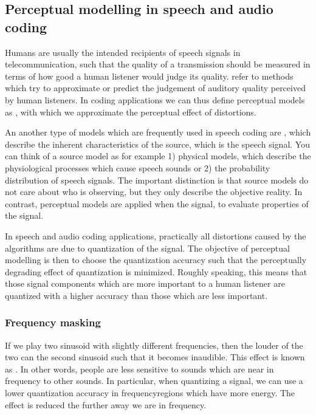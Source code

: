 \documentclass[letterpaper,10pt,english]{jupyterBook}
\begin{document}
\subsection{Perceptual modelling in speech and audio coding}
\label{\detokenize{Transmission/Perceptual_modelling_in_speech_and_audio_coding:perceptual-modelling-in-speech-and-audio-coding}}\label{\detokenize{Transmission/Perceptual_modelling_in_speech_and_audio_coding::doc}}
\sphinxAtStartPar
Humans are usually the intended recipients of speech signals in
telecommunication, such that the quality of a transmission should be
measured in terms of how good a human listener would judge its quality.
 refer to methods which try to approximate or predict
the judgement of auditory quality perceived by human listeners. In
coding applications we can thus define perceptual models as , with which we approximate the perceptual effect of distortions.

\sphinxAtStartPar
An another type of models which are frequently used in speech coding are
, which describe the inherent characteristics of the
source, which is the speech signal. You can think of a source model as
for example 1) physical models, which describe the physiological
processes which cause speech sounds or 2) the probability distribution
of speech signals. The important distinction is that source models do
not care about who is observing, but they only describe the objective
reality. In contrast, perceptual models are applied when  the signal, to evaluate properties of the signal.

\sphinxAtStartPar
In speech and audio coding applications, practically all distortions
caused by the algorithms are due to quantization of the signal. The
objective of perceptual modelling is then to choose the quantization
accuracy such that the perceptually degrading effect of quantization is
minimized. Roughly speaking, this means that those signal components
which are more important to a human listener are quantized with a higher
accuracy than those which are less important.


\subsubsection{Frequency masking}
\label{\detokenize{Transmission/Perceptual_modelling_in_speech_and_audio_coding:frequency-masking}}
\sphinxAtStartPar
If we play two sinusoid with slightly different frequencies, then the
louder of the two can  the second sinusoid such that it becomes
inaudible. This effect is known as . In other words,
people are less sensitive to sounds which are near in frequency to other
sounds. In particular, when quantizing a signal, we can use a lower
quantization accuracy in frequency\sphinxhyphen{}regions which have more energy. The
effect is reduced the further away we are in frequency.
\end{document}
